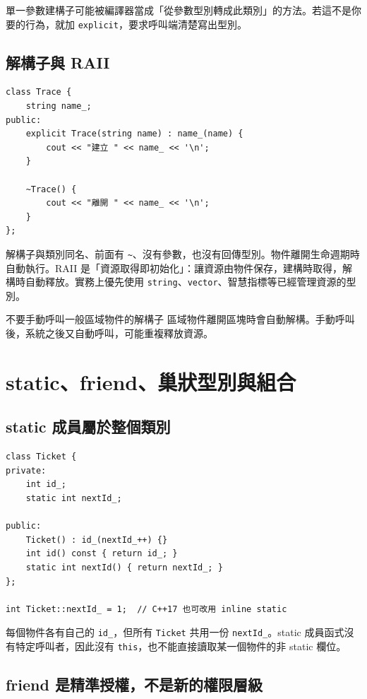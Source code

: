 \documentclass[11pt,a4paper]{article}
\newcommand{\code}[1]{\texttt{#1}}
\begin{document}
單一參數建構子可能被編譯器當成「從參數型別轉成此類別」的方法。若這不是你要的行為，就加 \code{explicit}，要求呼叫端清楚寫出型別。

\subsection{解構子與 RAII}

\begin{lstlisting}
class Trace {
    string name_;
public:
    explicit Trace(string name) : name_(name) {
        cout << "建立 " << name_ << '\n';
    }

    ~Trace() {
        cout << "離開 " << name_ << '\n';
    }
};
\end{lstlisting}

解構子與類別同名、前面有 \code{\~}、沒有參數，也沒有回傳型別。物件離開生命週期時自動執行。RAII 是「資源取得即初始化」：讓資源由物件保存，建構時取得，解構時自動釋放。實務上優先使用 \code{string}、\code{vector}、智慧指標等已經管理資源的型別。

\begin{warnbox}{不要手動呼叫一般區域物件的解構子}
區域物件離開區塊時會自動解構。手動呼叫後，系統之後又自動呼叫，可能重複釋放資源。
\end{warnbox}

\section{static、friend、巢狀型別與組合}

\subsection{static 成員屬於整個類別}

\begin{lstlisting}
class Ticket {
private:
    int id_;
    static int nextId_;

public:
    Ticket() : id_(nextId_++) {}
    int id() const { return id_; }
    static int nextId() { return nextId_; }
};

int Ticket::nextId_ = 1;  // C++17 也可改用 inline static
\end{lstlisting}

每個物件各有自己的 \code{id\_}，但所有 \code{Ticket} 共用一份 \code{nextId\_}。static 成員函式沒有特定呼叫者，因此沒有 \code{this}，也不能直接讀取某一個物件的非 static 欄位。

\subsection{friend 是精準授權，不是新的權限層級}
\end{document}
